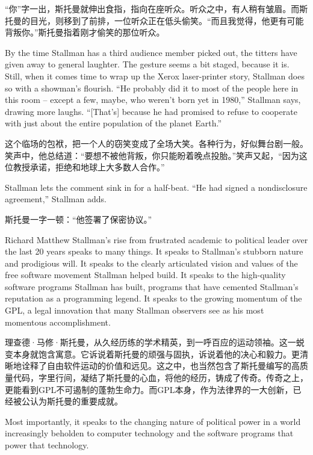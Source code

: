 \ifdefined\chs
“你”字一出，斯托曼就伸出食指，指向在座听众。听众之中，有人稍有皱眉。而斯托曼的目光，则移到了前排，一位听众正在低头偷笑。“而且我觉得，他更有可能背叛你。”斯托曼指着刚才偷笑的那位听众。
\fi

\ifdefined\eng
By the time Stallman has a third audience member picked out, the titters have given away to general laughter. The gesture seems a bit staged, because it is. Still, when it comes time to wrap up the Xerox laser-printer story, Stallman does so with a showman's flourish. ``He probably did it to most of the people here in this room -- except a few, maybe, who weren't born yet in 1980,'' Stallman says, drawing more laughs. ``[That's] because he had promised to refuse to cooperate with just about the entire population of the planet Earth.''
\fi

\ifdefined\chs
这个临场的包袱，把一个人的窃笑变成了全场大笑。各种行为，好似舞台剧一般。笑声中，他总结道：“要想不被他背叛，你只能盼着晚点投胎。”笑声又起，“因为这位教授承诺，拒绝和地球上大多数人合作。”
\fi

\ifdefined\eng
Stallman lets the comment sink in for a half-beat. ``He had signed a nondisclosure agreement,'' Stallman adds.
\fi

\ifdefined\chs
斯托曼一字一顿：“他签署了保密协议。”
\fi

\ifdefined\eng
Richard Matthew Stallman's rise from frustrated academic to political leader over the last 20 years speaks to many things. It speaks to Stallman's stubborn nature and prodigious will. It speaks to the clearly articulated vision and values of the free software movement Stallman helped build. It speaks to the high-quality software programs Stallman has built, programs that have cemented Stallman's reputation as a programming legend. It speaks to the growing momentum of the GPL, a legal innovation that many Stallman observers see as his most momentous accomplishment.
\fi

\ifdefined\chs
理查德·马修·斯托曼，从久经历练的学术精英，到一呼百应的运动领袖。这一蜕变本身就饱含寓意。它诉说着斯托曼的顽强与固执，诉说着他的决心和毅力。更清晰地诠释了自由软件运动的价值和远见。这之中，也当然包含了斯托曼编写的高质量代码，字里行间，凝结了斯托曼的心血，将他的经历，铸成了传奇。传奇之上，更能看到GPL不可遏制的蓬勃生命力。而GPL本身，作为法律界的一大创新，已经被公认为斯托曼的重要成就。
\fi

\ifdefined\eng
Most importantly, it speaks to the changing nature of political power in a world increasingly beholden to computer technology and the software programs that power that technology.
\fi

